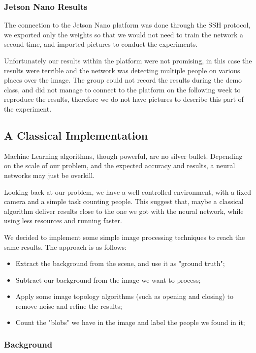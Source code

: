 \documentclass[conference]{IEEEtran}
\begin{document}
\subsubsection{Jetson Nano Results}

The connection to the Jetson Nano platform was done through the SSH protocol, we exported only the weights so that we would not need to train the network a second time, and imported pictures to conduct the experiments.

Unfortunately our results within the platform were not promising, in this case the results were terrible and the network was detecting multiple people on various places over the image. The group could not record the results during the demo class, and did not manage to connect to the platform on the following week to reproduce the results, therefore we do not have pictures to describe this part of the experiment.

\subsection{A Classical Implementation}

Machine Learning algorithms, though powerful, are no silver bullet. Depending on the scale of our problem, and the expected accuracy and results, a neural networks may just be overkill.

Looking back at our problem, we have a well controlled environment, with a fixed camera and a simple task counting people. This suggest that, maybe a classical algorithm deliver results close to the one we got with the neural network, while using less resources and running faster.

We decided to implement some simple image processing techniques to reach the same results. The approach is as follows:

\begin{itemize}
    \item Extract the background from the scene, and use it as "ground truth";
    \item Subtract our background from the image we want to process;
    \item Apply some image topology algorithms (such as opening and closing) to remove noise and refine the results;
    \item Count the "blobs" we have in the image and label the people we found in it;
\end{itemize}

\subsubsection{Background}
\end{document}
